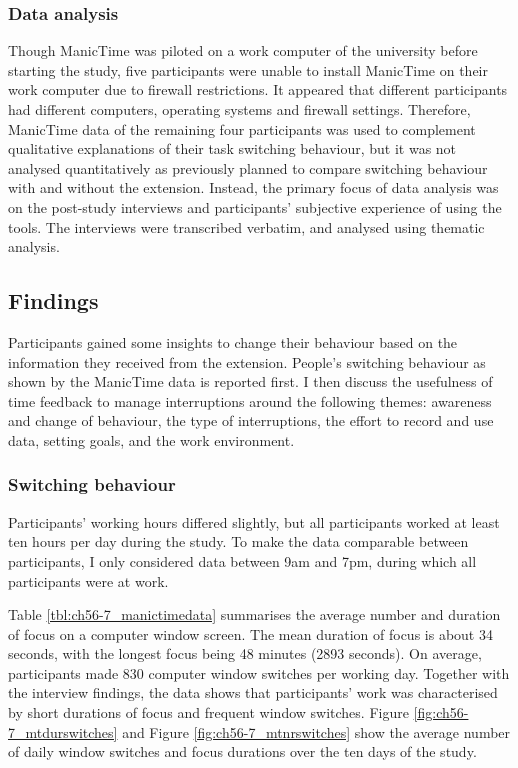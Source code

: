 \subsubsection{Data analysis}
Though ManicTime was piloted on a work computer of the university before starting the study, five participants were unable to install ManicTime on their work computer due to firewall restrictions. It appeared that different participants had different computers, operating systems and firewall settings. %
Therefore, ManicTime data of the remaining four participants was used to complement qualitative explanations of their task switching behaviour, but it was not analysed quantitatively as previously planned to compare switching behaviour with and without the extension. Instead, the primary focus of data analysis was on the post-study interviews and participants' subjective experience of using the tools. The interviews were transcribed verbatim, and analysed using thematic analysis.
\subsection{Findings}
Participants gained some insights to change their behaviour based on the information they received from the extension. People’s switching behaviour as shown by the ManicTime data is reported first. I then discuss the usefulness of time feedback to manage interruptions around the following themes: awareness and change of behaviour, the type of interruptions, the effort to record and use data, setting goals, and the work environment.

\subsubsection{Switching behaviour}
Participants’ working hours differed slightly, but all participants worked at least ten hours per day during the study. To make the data comparable between participants, I only considered data between 9am and 7pm, during which all participants were at work. 

Table \ref{tbl:ch56-7_manictimedata} summarises the average number and duration of focus on a computer window screen. The mean duration of focus is about 34 seconds, with the longest focus being 48 minutes (2893 seconds). On average, participants made 830 computer window switches per working day. %
Together with the interview findings, the data shows that participants’ work was characterised by short durations of focus and frequent window switches. Figure \ref{fig:ch56-7_mtdurswitches} and Figure \ref{fig:ch56-7_mtnrswitches} show the average number of daily window switches and focus durations over the ten days of the study.

